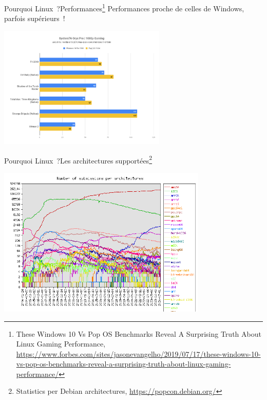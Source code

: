 \documentclass{beamer}
\begin{document}
    \begin{frame}{Pourquoi Linux~?}{Performances\footnote{These Windows 10 Vs Pop OS Benchmarks Reveal A Surprising Truth About Linux Gaming Performance, \url{https://www.forbes.com/sites/jasonevangelho/2019/07/17/these-windows-10-vs-pop-os-benchmarks-reveal-a-surprising-truth-about-linux-gaming-performance/}}}
        Performances proche de celles de Windows, parfois supérieurs~!
        \begin{center}
            \includegraphics[width=8cm]{image/linux-vs-windows}
        \end{center}
    \end{frame}

    \begin{frame}{Pourquoi Linux~?}{Les architectures supportées\footnote{Statistics per Debian architectures, \url{https://popcon.debian.org/}}}
        \begin{center}
            \includegraphics[width=10cm]{image/submission-by-architecture}
        \end{center}
    \end{frame}
\end{document}
